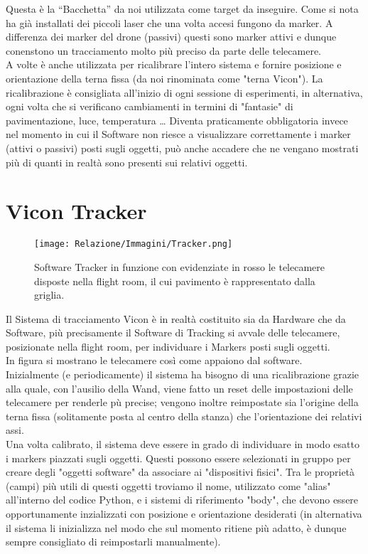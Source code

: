 Questa è la “Bacchetta” da noi utilizzata come target da inseguire. Come si nota ha già installati dei piccoli laser che una volta accesi fungono da marker. A differenza dei marker del drone (passivi) questi sono marker attivi e dunque conenstono un tracciamento molto più preciso da parte delle telecamere. \\
A volte è anche utilizzata per ricalibrare l’intero sistema e fornire posizione e orientazione della terna fissa (da noi rinominata come  "terna Vicon"). La ricalibrazione è consigliata all'inizio di ogni sessione di esperimenti, in alternativa, ogni volta che si verificano cambiamenti in termini di "fantasie" di pavimentazione, luce, temperatura … Diventa praticamente obbligatoria invece nel momento in cui il Software non riesce a visualizzare correttamente i marker (attivi o passivi) posti sugli oggetti, può anche accadere che ne vengano mostrati più di quanti in realtà sono presenti sui relativi oggetti. 

\section*{Vicon Tracker}

\begin{figure}[h]
    \centering
    \texttt{[image: Relazione/Immagini/Tracker.png]}
    \caption{Software Tracker in funzione con evidenziate in rosso le telecamere disposte nella flight room, il cui pavimento è rappresentato dalla griglia.}
    \label{fig:Tracker}
\end{figure}

Il Sistema di tracciamento Vicon è in realtà costituito sia da Hardware che da Software, più precisamente il Software di Tracking si avvale delle telecamere, posizionate nella flight room, per individuare i Markers posti sugli oggetti. \\
In figura si mostrano le telecamere così come appaiono dal software. \\
Inizialmente (e periodicamente) il sistema ha bisogno di una ricalibrazione grazie alla quale, con l'ausilio della Wand, viene fatto un reset delle impostazioni delle telecamere per renderle pù precise; vengono inoltre reimpostate sia l'origine della terna fissa (solitamente posta al centro della stanza) che l'orientazione dei relativi assi. \\
Una volta calibrato, il sistema deve essere in grado di individuare in modo esatto i markers piazzati sugli oggetti. Questi possono essere selezionati in gruppo per creare degli "oggetti software" da associare ai "dispositivi fisici". Tra le proprietà (campi) più utili di questi oggetti troviamo il nome, utilizzato come "alias" all'interno del codice Python, e i sistemi di riferimento "body", che devono essere opportunamente inzializzati con posizione e orientazione desiderati (in alternativa il sistema li inizializza nel modo che sul momento ritiene più adatto, è dunque sempre consigliato di reimpostarli manualmente). 